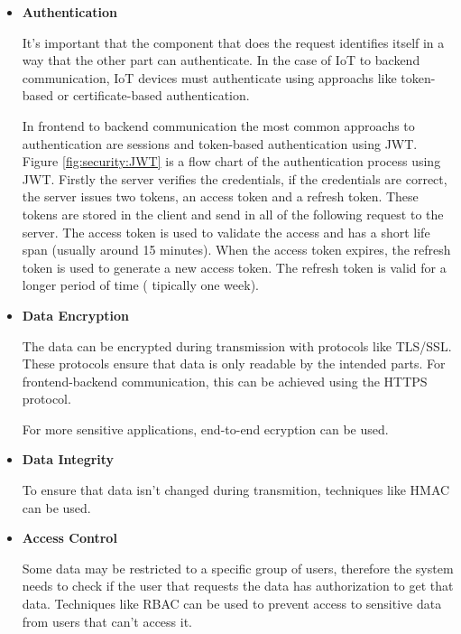 \begin{itemize}

	\item \textbf{Authentication}

	      It's important that the component that does the request identifies itself
	      in a way that the other part can authenticate.
	      In the case of \gls{IoT} to backend communication, \gls{IoT} devices must authenticate
	      using approachs like token-based or certificate-based authentication.

	      In frontend to backend communication the most common approachs to
	      authentication are sessions and token-based authentication using \gls{JWT}.
	      Figure \ref{fig:security:JWT}
	      is a flow chart of the authentication process using \gls{JWT}.
	      Firstly the server verifies the credentials, if the credentials are
	      correct, the server issues two tokens, an access token and a refresh
	      token. These tokens are stored in the client and send in all of the
	      following request to the server. The access token is used to validate
	      the access and has a short life span (usually around 15 minutes). When
	      the access token expires, the refresh token is used to generate a new
	      access token. The refresh token is valid for a longer period of time (
	      tipically one week).

	\item \textbf{Data Encryption}

	      The data can be encrypted during transmission with protocols like \gls{TLS}/\gls{SSL}.
	      These protocols ensure that data is only readable by the intended parts.
	      For frontend-backend communication, this can be achieved using the \gls{HTTPS}
	      protocol.

	      For more sensitive applications, end-to-end ecryption can be used.

	\item \textbf{Data Integrity}

	      To ensure that data isn't changed during transmition, techniques like
	      \gls{HMAC} can be used.

	\item \textbf{Access Control}

	      Some data may be restricted to a specific group of users, therefore the
	      system needs to check if the user that requests the data has
	      authorization to get that data. Techniques like \gls{RBAC} can be used to
	      prevent access to sensitive data from users that can't access it.


\end{itemize}

